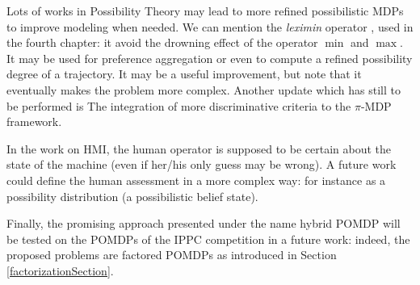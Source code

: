 Lots of works in Possibility Theory
may lead to more refined possibilistic MDPs
to improve modeling when needed.
We can mention the \textit{leximin} operator \cite{lexirefin},
used in the fourth chapter:
it avoid the drowning effect
of the operator $\min$ and $\max$.
It may be used for preference aggregation
or even to compute a refined possibility degree 
of a trajectory. 
It may be a useful improvement,
but note that it eventually makes 
the problem more complex.
Another update which has still to be performed
is The integration 
of more discriminative criteria 
\cite{LIP61723,conf/uai/GiangS01} 
to the $\pi$-MDP framework.

In the work on HMI, 
the human operator is supposed to be certain 
about the state of the machine 
(even if her/his only guess may be wrong).
A future work could define 
the human assessment in a more complex way:
for instance as a possibility distribution
(a possibilistic belief state).


Finally, the promising approach 
presented under the name hybrid POMDP
will be tested on the POMDPs 
of the IPPC competition \cite{SannerIPPC1111} in a future work:
indeed, the proposed problems
are factored POMDPs
as introduced in Section \ref{factorizationSection}.
